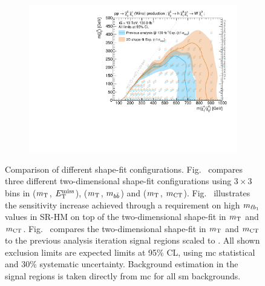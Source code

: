\begin{figure}
\begin{subfigure}[b]{0.5\linewidth}
		\centering\includegraphics[width=1.0\textwidth]{HF/plot_2d_shapefit_cls}
		\caption{\label{fig:plot_2d_shapefit_cls}}
	\end{subfigure}\hfill

	\caption{Comparison of different shape-fit configurations. Fig.~ compares three different two-dimensional shape-fit configurations using $3\times 3$ bins in ($m_{\textrm{T}}$, $E_{\textrm{T}}^{\textrm{miss}}$), ($m_{\textrm{T}}$, $m_{b\bar{b}}$) and ($m_{\textrm{T}}$, $m_{\textrm{CT}}$). Fig.~ illustrates the sensitivity increase achieved through a requirement on high $m_{\ell b_{1}}$ values in SR-HM on top of the two-dimensional shape-fit in $m_{\textrm{T}}$ and $m_{\textrm{CT}}$. Fig.~ compares the two-dimensional shape-fit in $m_{\textrm{T}}$ and $m_{\textrm{CT}}$ to the previous analysis iteration signal regions scaled to \onethirtynineifb. All shown exclusion limits are expected limits at 95\% CL, using \gls{mc} statistical and 30\% systematic uncertainty. Background estimation in the signal regions is taken directly from \gls{mc} for all \gls{sm} backgrounds.}
	\label{fig:results_HF_scan_app}
\end{figure}



\FloatBarrier
